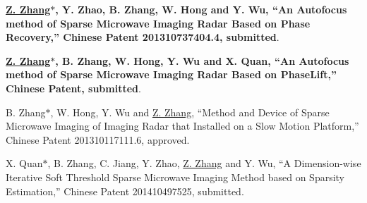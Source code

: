 \documentclass[paper=a4,fontsize=11pt]{scrartcl}
\begin{document}
\begin{description}

\item \textbf{\underline{Z. Zhang$\ast$}, Y. Zhao, B. Zhang, W. Hong and Y. Wu, ``An Autofocus method of Sparse Microwave Imaging Radar Based on Phase Recovery,'' Chinese Patent 201310737404.4, submitted}.

\item \textbf{\underline{Z. Zhang$\ast$}, B. Zhang, W. Hong, Y. Wu and X. Quan, ``An Autofocus method of Sparse Microwave Imaging Radar Based on PhaseLift,'' Chinese Patent, submitted}.

\item B. Zhang$\ast$, W. Hong, Y. Wu and \underline{Z. Zhang}, ``Method and Device of Sparse Microwave Imaging of Imaging Radar that Installed on a Slow Motion Platform,'' Chinese Patent 201310117111.6, approved.

\item X. Quan$\ast$, B. Zhang, C. Jiang, Y. Zhao, \underline{Z. Zhang} and Y. Wu, ``A Dimension-wise Iterative Soft Threshold Sparse Microwave Imaging Method based on Sparsity Estimation,'' Chinese Patent 201410497525, submitted.

\end{description}
\end{document}
